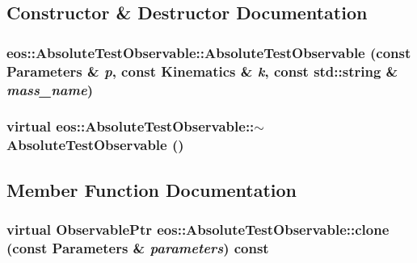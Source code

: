 \subsection{Constructor \& Destructor Documentation}
\hypertarget{structeos_1_1AbsoluteTestObservable_a0e044df3b5ec549d51547e8b9f8af55b}{
\subsubsection[{AbsoluteTestObservable}]{\setlength{\rightskip}{0pt plus 5cm}eos::AbsoluteTestObservable::AbsoluteTestObservable (const {\bf Parameters} \& {\em p}, \/  const {\bf Kinematics} \& {\em k}, \/  const std::string \& {\em mass\_\-name})}}
\label{structeos_1_1AbsoluteTestObservable_a0e044df3b5ec549d51547e8b9f8af55b}
\hypertarget{structeos_1_1AbsoluteTestObservable_ad2fa287cd756cd2d2e639ef39106debe}{
\subsubsection[{$\sim$AbsoluteTestObservable}]{\setlength{\rightskip}{0pt plus 5cm}virtual eos::AbsoluteTestObservable::$\sim$AbsoluteTestObservable ()}}
\label{structeos_1_1AbsoluteTestObservable_ad2fa287cd756cd2d2e639ef39106debe}


\subsection{Member Function Documentation}
\hypertarget{structeos_1_1AbsoluteTestObservable_af0a14d774c083598130b3062f956c4c9}{
\subsubsection[{clone}]{\setlength{\rightskip}{0pt plus 5cm}virtual {\bf ObservablePtr} eos::AbsoluteTestObservable::clone (const {\bf Parameters} \& {\em parameters}) const}}
\label{structeos_1_1AbsoluteTestObservable_af0a14d774c083598130b3062f956c4c9}



